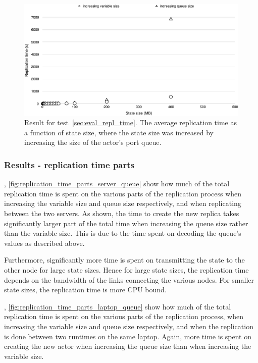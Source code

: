 \documentclass{cslthse-msc}
\begin{document}
\begin{figure}[hbt!]
\centering
\includegraphics[scale=0.5]{images/results/replication_time/laptop.pdf} 
\caption{Result for test~\ref{sec:eval_repl_time}. The average replication time as a function of state size, where the state size was increased by increasing the size of the actor's port queue.} \label{fig:replication_time_laptop}
\end{figure}

\subsubsection*{Results - replication time parts}
, \cref{fig:replication_time_parts_server_queue} show how much of the total replication time is spent on the various parts of the replication process when increasing the variable size and queue size respectively, and when replicating between the two servers. As shown, the time to create the new replica takes significantly larger part of the total time when increasing the queue size rather than the variable size. This is due to the time spent on decoding the queue's values as described above.

Furthermore, significantly more time is spent on transmitting the state to the other node for large state sizes. Hence for large state sizes, the replication time depends on the bandwidth of the links connecting the various nodes. For smaller state sizes, the replication time is more CPU bound.

, \cref{fig:replication_time_parts_laptop_queue} show how much of the total replication time is spent on the various parts of the replication process, when increasing the variable size and queue size respectively, and when the replication is done between two runtimes on the same laptop. Again, more time is spent on creating the new actor when increasing the queue size than when increasing the variable size.
\end{document}
